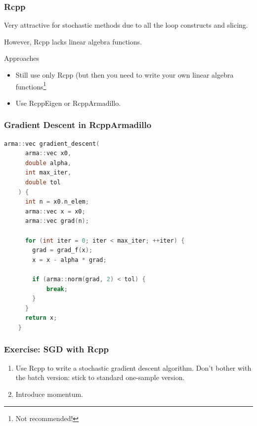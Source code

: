 \documentclass[aspectratio=1610,onlytextwidth]{beamer}
\begin{document}

\begin{frame}[c]
  \frametitle{Rcpp}

  Very attractive for stochastic methods due to all the loop constructs and slicing.

  \medskip

  However, Rcpp lacks linear algebra functions.

  \begin{block}{Approaches}
    \begin{itemize}
      \item Still use only Rcpp (but then you need to write your own linear algebra functions\footnote{Not recommended!}
      \item Use RcppEigen or RcppArmadillo.
    \end{itemize}
  \end{block}
\end{frame}

\begin{frame}[c,fragile]
  \frametitle{Gradient Descent in RcppArmadillo}
  \begin{lstlisting}[language=C++]
    arma::vec gradient_descent(
      arma::vec x0,
      double alpha,
      int max_iter,
      double tol
    ) {
      int n = x0.n_elem;
      arma::vec x = x0;
      arma::vec grad(n);

      for (int iter = 0; iter < max_iter; ++iter) {
        grad = grad_f(x);
        x = x - alpha * grad;

        if (arma::norm(grad, 2) < tol) {
            break;
        }
      }
      return x;
    }
  \end{lstlisting}
\end{frame}

\begin{frame}[c]
  \frametitle{Exercise: SGD with Rcpp}

  \begin{enumerate}
    \item Use Rcpp to write a stochastic gradient descent algorithm. Don't
          bother with the batch version: stick to standard one-sample version.
    \item Introduce momentum.
  \end{enumerate}

\end{frame}
\end{document}
